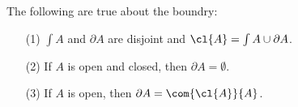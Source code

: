 \begin{example}\label{}
    The following are true about the boundry:
    \begin{enumerate}
        \item[(1)] $\int{A}$ and $\partial{A}$ are disjoint and $\cl{A}=\int{A}
            \cup \partial{A}$.

        \item[(2)] If $A$ is open and closed, then $\partial{A}=\emptyset$.

        \item[(3)] If $A$ is open, then  $\partial{A}=\com{\cl{A}}{A}$.
    \end{enumerate}
\end{example}
